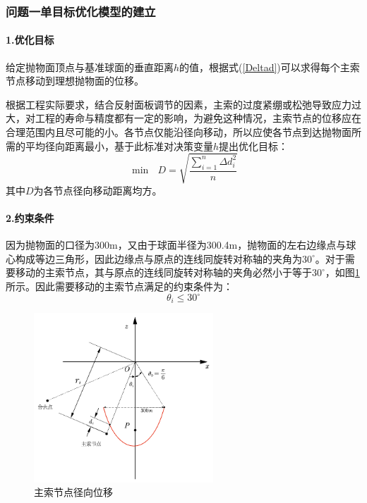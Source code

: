 \documentclass[withoutpreface,bwprint]{cumcmthesis} %
\begin{document}
		\subsubsection{问题一单目标优化模型的建立}
		\paragraph{1.优化目标}
	
		给定抛物面顶点与基准球面的垂直距离$h$的值，根据式(\ref{Deltad})可以求得每个主索节点移动到理想抛物面的位移。
		
		根据工程实际要求，结合反射面板调节的因素，主索的过度紧绷或松弛导致应力过大，对工程的寿命与精度都有一定的影响，为避免这种情况，主索节点的位移应在合理范围内且尽可能的小。各节点仅能沿径向移动，所以应使各节点到达抛物面所需的平均径向距离最小，基于此标准对决策变量$h$提出优化目标：
		\begin{equation}\label{mb1}
		\min\text{ }D=\sqrt{\frac{\sum_{i=1}^n{\Delta d_i^2}}{n}}
		\end{equation}
		其中$D$为各节点径向移动距离均方。
		\paragraph{2.约束条件}
		
		因为抛物面的口径为300m，又由于球面半径为300.4m，抛物面的左右边缘点与球心构成等边三角形，因此边缘点与原点的连线同旋转对称轴的夹角为$30^\circ$。对于需要移动的主索节点，其与原点的连线同旋转对称轴的夹角必然小于等于$30^\circ$，如图\ref{主索节点径向位移}所示。因此需要移动的主索节点满足的约束条件为：
		\begin{equation}\label{ys1}
		\theta_i \leqslant 30^\circ
		\end{equation}
		
				\begin{figure}[!htp]
			\centering
			\includegraphics[width=0.6\textwidth]{主索节点径向位移}
			\caption{主索节点径向位移}
			\label{主索节点径向位移}
		\end{figure}
		
\end{document}
